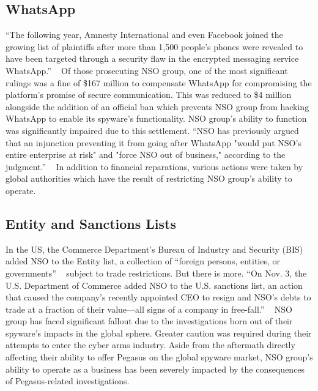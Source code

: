 \documentclass[sigconf]{acmart}
\begin{document}
\subsection{WhatsApp}
“The following year, Amnesty International and even Facebook joined the growing list of plaintiffs after more than 1,500 people’s phones were revealed to have been targeted through a security flaw in the encrypted messaging service WhatsApp.” ~\cite{used_fourth(3)} Of those prosecuting NSO group, one of the most significant rulings was a fine of \$167 million to compensate WhatsApp for compromising the platform’s promise of secure communication. This was reduced to \$4 million alongside the addition of an official ban which prevents NSO group from hacking WhatsApp to enable its spyware’s functionality. NSO group’s ability to function was significantly impaired due to this settlement. “NSO has previously argued that an injunction preventing it from going after WhatsApp "would put NSO’s entire enterprise at risk" and "force NSO out of business," according to the judgment.” ~\cite{used_fifth(8)} In addition to financial reparations, various actions were taken by global authorities which have the result of restricting NSO group’s ability to operate.
\subsection{Entity and Sanctions Lists}
In the US, the Commerce Department’s Bureau of Industry and Security (BIS) added NSO to the Entity list, a collection of “foreign persons, entities, or governments” ~\cite{used_sixth(9)} subject to trade restrictions. But there is more. “On Nov. 3, the U.S. Department of Commerce added NSO to the U.S. sanctions list, an action that caused the company’s recently appointed CEO to resign and NSO’s debts to trade at a fraction of their value—all signs of a company in free-fall.” ~\cite{used_seventh(10)} NSO group has faced significant fallout due to the investigations born out of their spyware’s impacts in the global sphere. Greater caution was required during their attempts to enter the cyber arms industry. Aside from the aftermath directly affecting their ability to offer Pegasus on the global spyware market, NSO group’s ability to operate as a business has been severely impacted by the consequences of Pegasus-related investigations.
\end{document}
